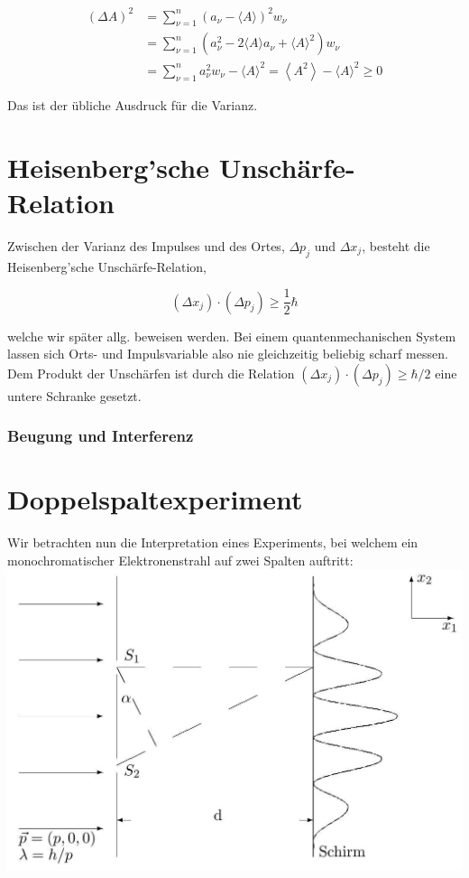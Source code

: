 \documentclass[10pt, letterpaper]{article}
\begin{document}
$$
\begin{aligned}
(\Delta A)^{2} & =\sum_{\nu=1}^{n}\left(a_{\nu}-\langle A\rangle\right)^{2} w_{\nu} \\
& =\sum_{\nu=1}^{n}\left(a_{\nu}^{2}-2\langle A\rangle a_{\nu}+\langle A\rangle^{2}\right) w_{\nu} \\
& =\sum_{\nu=1}^{n} a_{\nu}^{2} w_{\nu}-\langle A\rangle^{2}=\left\langle A^{2}\right\rangle-\langle A\rangle^{2} \geq 0
\end{aligned}
$$

Das ist der übliche Ausdruck für die Varianz.

\section*{Heisenberg'sche Unschärfe-Relation}
Zwischen der Varianz des Impulses und des Ortes, $\Delta p_{j}$ und $\Delta x_{j}$, besteht die Heisenberg'sche Unschärfe-Relation,

$$
\left(\Delta x_{j}\right) \cdot\left(\Delta p_{j}\right) \geq \frac{1}{2} \hbar
$$

welche wir später allg. beweisen werden. Bei einem quantenmechanischen System lassen sich Orts- und Impulsvariable also nie gleichzeitig beliebig scharf messen. Dem Produkt der Unschärfen ist durch die Relation $\left(\Delta x_{j}\right) \cdot\left(\Delta p_{j}\right) \geq \hbar / 2$ eine untere Schranke gesetzt.

\subsubsection*{Beugung und Interferenz}
\section*{Doppelspaltexperiment}
Wir betrachten nun die Interpretation eines Experiments, bei welchem ein monochromatischer Elektronenstrahl auf zwei Spalten auftritt:\\
\includegraphics[scale=0.2, center]{2025_05_21_11b1754c718f6fcf84f8g-19}
\end{document}
